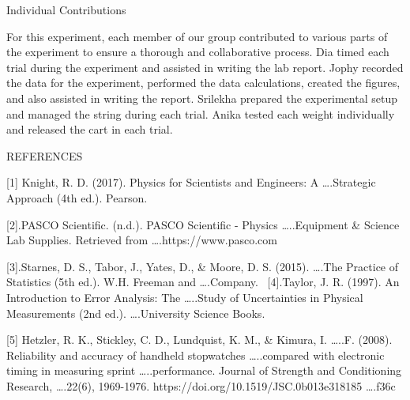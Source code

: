 Individual Contributions


For this experiment, each member of our group contributed to various parts of the experiment to ensure a thorough and collaborative process. Dia timed each trial during the experiment and assisted in writing the lab report. Jophy recorded the data for the experiment, performed the data calculations, created the figures, and also assisted in writing the report. Srilekha prepared the experimental setup and managed the string during each trial. Anika tested each weight individually and released the cart in each trial. 


REFERENCES


[1] Knight, R. D. (2017). Physics for Scientists and Engineers: A   ….Strategic Approach (4th ed.). Pearson.


[2].PASCO Scientific. (n.d.). PASCO Scientific - Physics …..Equipment & Science Lab Supplies. Retrieved from ….https://www.pasco.com


[3].Starnes, D. S., Tabor, J., Yates, D., & Moore, D. S. (2015). ….The Practice of Statistics (5th ed.). W.H. Freeman and ….Company.
\
[4].Taylor, J. R. (1997). An Introduction to Error Analysis: The …..Study of Uncertainties in Physical Measurements (2nd ed.). ….University Science Books.


[5] Hetzler, R. K., Stickley, C. D., Lundquist, K. M., & Kimura, I. …..F. (2008). Reliability and accuracy of handheld stopwatches …..compared with electronic timing in measuring sprint …..performance. Journal of Strength and Conditioning Research, ….22(6), 1969-1976.  https://doi.org/10.1519/JSC.0b013e318185
….f36c